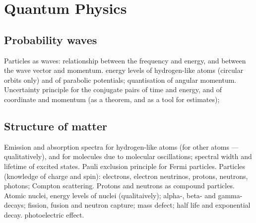 \part{Quantum Physics}
\chapter{Probability waves}
Particles as waves: relationship between the frequency and energy, and between the wave vector and momentum. energy levels of hydrogen-like atoms (circular orbits only) and of parabolic potentials; quantisation of angular momentum.
Uncertainty principle for the conjugate pairs of time and energy, and of coordinate and momentum (as a theorem, and as a tool for estimates);
\pagebreak

\chapter{Structure of matter}
Emission and absorption spectra for hydrogen-like atoms (for other atoms — qualitatively), and for molecules due to molecular oscillations; spectral width and lifetime of excited states. Pauli exclusion principle for Fermi particles. Particles (knowledge of charge and spin): electrons, electron neutrinos, protons, neutrons, photons; Compton scattering. Protons and neutrons as compound particles. Atomic nuclei, energy levels of nuclei (qualitaively); alpha-, beta- and gamma-decays; fission, fusion and neutron capture; mass defect; half life and exponential decay. photoelectric effect.

